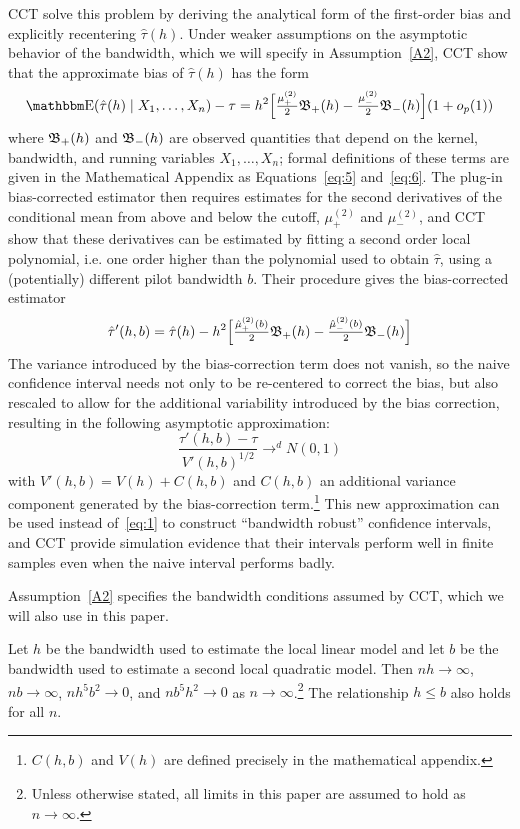 \documentclass[12pt,fleqn]{article}
\begin{document}
CCT solve this problem by deriving the analytical form of the first-order bias
and explicitly recentering $\hat\tau(h)$. Under weaker assumptions on the
asymptotic behavior of the bandwidth, which we will specify in
Assumption~\ref{A2}, CCT show that the approximate bias of $\hat\tau(h)$ has the
form
\begin{equation*}
  \E(\hat{\tau}(h) \mid X_1,\dots,X_n) - \tau =
  h^{2}\Big[ \tfrac{\mu_{+}^{(2)}}{2}\Bf_{+}(h)
  - \tfrac{\mu_{-}^{(2)}}{2}\Bf_{-}(h) \Big]
  (1+o_{p}(1))
\end{equation*}
where $\mathfrak{B}_{+}(h)$ and $\mathfrak{B}_{-}(h)$ are observed quantities that depend on the
kernel, bandwidth, and running variables $X_1,\dots,X_n$; formal definitions of
these terms are given in the Mathematical Appendix as Equations~\eqref{eq:5}
and~\eqref{eq:6}. The plug-in bias-corrected estimator then requires estimates
for the second derivatives of the conditional mean from above and below the
cutoff, $\mu_{+}^{(2)}$ and $\mu_{-}^{(2)}$, and CCT show that these derivatives
can be estimated by fitting a second order local polynomial, i.e. one order
higher than the polynomial used to obtain $\hat{\tau}$, using a (potentially)
different pilot bandwidth $b$. Their procedure gives the bias-corrected
estimator
\begin{gather*}
  \hat{\tau}'(h, b) = \hat{\tau}(h) - h^{2}
  \Big[\tfrac{\hat{\mu}_{+}^{(2)}(b)}{2} \mathfrak{B}_{+}(h)
  - \tfrac{\hat{\mu}_{-}^{(2)}(b)}{2}\mathfrak{B}_{-}(h) \Big]
\end{gather*}
The variance introduced by the bias-correction term does not vanish, so the
naive confidence interval needs not only to be re-centered to correct the bias,
but also rescaled to allow for the additional variability introduced by the bias
correction, resulting in the following asymptotic approximation:
\begin{equation*}
  \frac{\hat{\tau}'(h, b) - \tau}{V'(h, b)^{1/2}} \to^d N(0,1)
\end{equation*}
with $V'(h, b) = V(h) + C(h, b)$ and $C(h, b)$ an additional variance component
generated by the bias-correction term.\footnote{%
  $C(h,b)$ and $V(h)$ are defined precisely in the mathematical appendix.} %
This new approximation can be used
instead of~\eqref{eq:1} to construct ``bandwidth robust'' confidence intervals,
and CCT provide simulation evidence that their intervals perform well in finite
samples even when the naive interval performs badly.

Assumption~\ref{A2} specifies the bandwidth conditions assumed by CCT, which we
will also use in this paper.
\begin{assumption}[Bandwidth]\label{A2}
  Let $h$ be the bandwidth used to estimate the local linear model and let
  $b$ be the bandwidth used to estimate a second local quadratic model. Then
  $n h \to \infty$, $n b \to \infty$, $n h^{5} b^{2} \to 0$, and
  $n b^{5} h^{2} \to 0$ as $n \to \infty$.\footnote{%
    Unless otherwise stated, all limits in this paper are assumed to hold as
    $n \to \infty$.} %
  The relationship $h \leq b$ also holds for all $n$.
\end{assumption}
\end{document}
